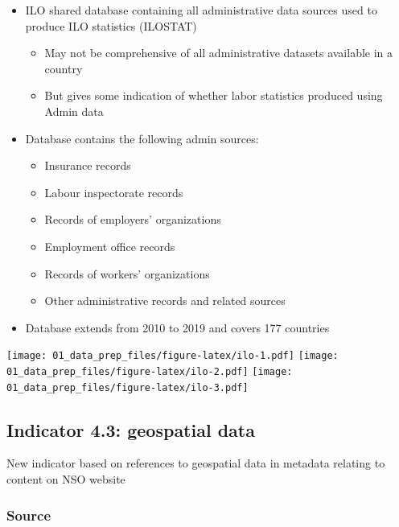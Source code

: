 \documentclass[]{article}
\providecommand{\tightlist}{%
  \setlength{\itemsep}{0pt}\setlength{\parskip}{0pt}}
\begin{document}
\begin{itemize}
\item
  ILO shared database containing all administrative data sources used to
  produce ILO statistics (ILOSTAT)

  \begin{itemize}
  \tightlist
  \item
    May not be comprehensive of all administrative datasets available in
    a country\\
  \item
    But gives some indication of whether labor statistics produced using
    Admin data
  \end{itemize}
\item
  Database contains the following admin sources:

  \begin{itemize}
  \tightlist
  \item
    Insurance records\\
  \item
    Labour inspectorate records\\
  \item
    Records of employers' organizations\\
  \item
    Employment office records
  \item
    Records of workers' organizations
  \item
    Other administrative records and related sources
  \end{itemize}
\item
  Database extends from 2010 to 2019 and covers 177 countries
\end{itemize}

\texttt{[image: 01\_data\_prep\_files/figure-latex/ilo-1.pdf]}
\texttt{[image: 01\_data\_prep\_files/figure-latex/ilo-2.pdf]}
\texttt{[image: 01\_data\_prep\_files/figure-latex/ilo-3.pdf]}

\hypertarget{indicator-4.3-geospatial-data}{%
\subsection{Indicator 4.3: geospatial
data}\label{indicator-4.3-geospatial-data}}

New indicator based on references to geospatial data in metadata
relating to content on NSO website

\hypertarget{source-1}{%
\subsubsection{Source}\label{source-1}}
\end{document}

